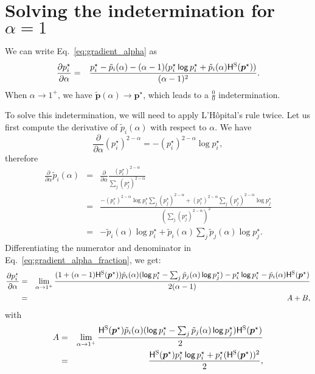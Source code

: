 \section*{Solving the indetermination for {\boldmath $\alpha=1$}}

We can write Eq.~\ref{eq:gradient_alpha} as
\begin{eqnarray}\label{eq:gradient_alpha_fraction}
    \frac{\partial p_i^{\star}}{\partial \alpha} &=&
    \frac{p_i^{\star} - \tilde{p}_i(\alpha) - (\alpha-1)(p_i^{\star}\operatorname*{\mathsf{log}} p_i^{\star} + \tilde{p}_i(\alpha)\mathsf{H}^{\textsc{S}}(\bm{p}^{\star}))}{(\alpha-1)^2}.
\end{eqnarray}
When $\alpha \rightarrow 1^+$, we have $\tilde{\bm{p}}(\alpha) \rightarrow \bm{p}^{\star}$, which leads to a $\frac{0}{0}$ indetermination.

To solve this indetermination, we will need to apply L'H\^opital's rule twice.
Let us first compute the derivative of $\tilde{p}_i(\alpha)$ with respect to $\alpha$. We have
\begin{equation}
    \frac{\partial}{\partial \alpha} (p_i^\star)^{2-\alpha} = -(p_i^{\star})^{2-\alpha} \log p_i^{\star},
\end{equation}
therefore
\begin{eqnarray}
    \frac{\partial}{\partial \alpha} \tilde{p}_i(\alpha) &=& \frac{\partial}{\partial \alpha} \frac{(p_i^\star)^{2-\alpha}}{\sum_j (p_j^\star)^{2-\alpha}}\nonumber\\
    &=& \frac{-(p_i^{\star})^{2-\alpha} \log p_i^{\star} \sum_j (p_j^\star)^{2-\alpha} + (p_i^{\star})^{2-\alpha} \sum_j (p_j^{\star})^{2-\alpha} \log p_j^{\star}}{\left( \sum_j (p_j^\star)^{2-\alpha} \right)^2}\nonumber\\
    &=& -\tilde{p}_i(\alpha)\log p_i^{\star} + \tilde{p}_i(\alpha) \sum_j \tilde{p}_j(\alpha) \log p_j^{\star}.
\end{eqnarray}
Differentiating the numerator and denominator in Eq.~\ref{eq:gradient_alpha_fraction}, we get:
\begin{eqnarray}\label{eq:gradient_alpha_shannon_01}
    \frac{\partial p_i^{\star}}{\partial \alpha} &=&
    \lim_{\alpha \rightarrow 1^+} \frac{(1 + (\alpha-1)\mathsf{H}^{\textsc{S}}(\bm{p}^{\star})) \tilde{p}_i(\alpha) (\operatorname*{\mathsf{log}} p_i^{\star} - \sum_j \tilde{p}_j(\alpha) \operatorname*{\mathsf{log}} p_j^{\star}) - p_i^{\star}\operatorname*{\mathsf{log}} p_i^{\star} - \tilde{p}_i(\alpha) \mathsf{H}^{\textsc{S}}(\bm{p}^{\star})}{2(\alpha-1)} \nonumber\\
    &=& A + B,
\end{eqnarray}
with
\begin{eqnarray}\label{eq:A_shannon}
    A &=& \lim_{\alpha \rightarrow 1^+} \frac{\mathsf{H}^{\textsc{S}}(\bm{p}^{\star}) \tilde{p}_i(\alpha) (\operatorname*{\mathsf{log}} p_i^{\star} - \sum_j \tilde{p}_j(\alpha) \operatorname*{\mathsf{log}} p_j^{\star}) \mathsf{H}^{\textsc{S}}(\bm{p}^{\star})}{2}\nonumber\\
    &=& \frac{\mathsf{H}^{\textsc{S}}(\bm{p}^{\star}) p_i^{\star}\operatorname*{\mathsf{log}} p_i^{\star} + p_i^{\star} (\mathsf{H}^{\textsc{S}}(\bm{p}^{\star}))^2}{2},
\end{eqnarray}
